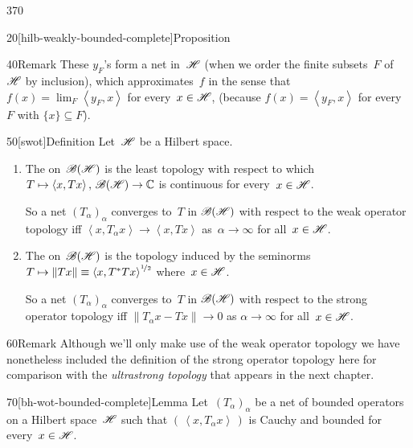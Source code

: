 \begin{parsec}{370}
\begin{point}{20}[hilb-weakly-bounded-complete]{Proposition}
\begin{point}{40}{Remark}
These $y_F$'s form a net in~$\mathscr{H}$
(when we order the finite subsets~$F$ of~$\mathscr{H}$ by inclusion),
which approximates~$f$ in the
sense that~$f(x)=\lim_F \left<y_F,x\right>$
for every~$x\in \mathscr{H}$,
(because 
$f(x)=\left<y_F,x\right>$
for every~$F$
with $\{x\}\subseteq F$).
\end{point}
\end{point}
\begin{point}{50}[swot]{Definition}%
Let~$\mathscr{H}$ be a Hilbert space.
\begin{enumerate}
\item
	The %
on~$\mathscr{B}(\mathscr{H})$ is the least topology
with respect to which $T\mapsto \left<x,Tx\right>,\,\mathscr{B}(\mathscr{H})\to\mathbb{C}$
is continuous for every~$x\in\mathscr{H}$.

So a net $(T_\alpha)_\alpha$
		converges to~$T$ in $\mathscr{B}(\mathscr{H})$
		with respect to the weak operator topology
		iff $\left<x,T_\alpha x\right>\to \left<x,Tx\right>$
		as~$\alpha\to\infty$ for all~$x\in \mathscr{H}$.
\item
	The %
on~$\mathscr{B}(\mathscr{H})$ is the topology induced by the seminorms
$T\mapsto \|Tx\|\equiv \smash{\left<x,T^*Tx\right>^{%
\nicefrac{1}{2}}}$
where~$x\in\mathscr{H}$.

		So a net $(T_\alpha)_\alpha$
		converges to~$T$
		in $\mathscr{B}(\mathscr{H})$
		with respect to the strong operator topology iff
		$\|T_\alpha x -Tx \| \to 0$ as $\alpha\to\infty$
		for all~$x\in\mathscr{H}$.
\end{enumerate}
\spacingfix%
\begin{point}{60}{Remark}%
Although we'll only make use of the weak operator
topology we have nonetheless included
the definition of the strong operator topology here
for comparison
with the \emph{ultrastrong
topology} that appears in the next chapter.
\end{point}
\end{point}
\begin{point}{70}[bh-wot-bounded-complete]{Lemma}%
Let~$(T_\alpha)_\alpha$ be a net of bounded operators
on a Hilbert space~$\mathscr{H}$
such that $(\,\left<x,T_\alpha x \right>\,)$ is
Cauchy and bounded for every~$x\in \mathscr{H}$.


\end{point}
\end{parsec}
